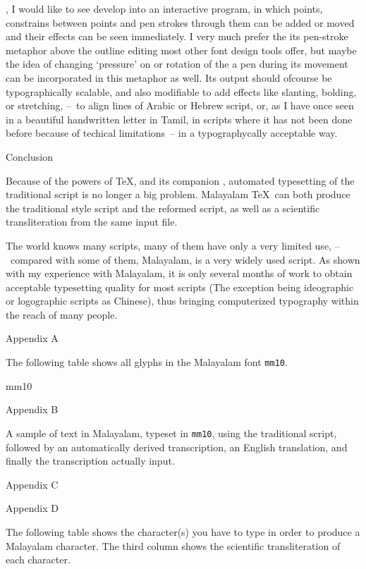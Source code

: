 \MF, I would like to see develop into an interactive program, in which 
points, constrains between points and pen strokes through them can be 
added or moved and their effects can be seen immediately. I very much 
prefer the its pen-stroke metaphor above the outline editing most 
other font design tools offer, but maybe the idea of changing 
`pressure' on or rotation of the a pen during its movement can be 
incorporated in this metaphor as well. Its output should ofcourse be
typographically scalable, and also modifiable to add effects like 
slanting, bolding, or stretching, --~to align lines of
Arabic or Hebrew script, or, as I have once seen in a beautiful
handwritten letter in Tamil, in scripts where it has not been done
before because of techical limitations~-- in a typographycally
acceptable way.

\beginsection Conclusion

Because of the powers of \TeX, and its companion \MF, automated 
typesetting of the traditional script is no longer a big problem. 
Malayalam \TeX\ can both produce the traditional style script and the 
reformed script, as well as a scientific transliteration from the same 
input file.

The world knows many scripts, many of them have only a very limited 
use, --~compared with some of them, Malayalam, is a very widely used 
script. As shown with my experience with Malayalam, it is only several 
months of work to obtain acceptable typesetting quality for most 
scripts (The exception being ideographic or logographic scripts as 
Chinese), thus bringing computerized typography within the reach of 
many people.

\beginsection Appendix A

The following table shows all glyphs in the Malayalam font {\tt mm10}.
\bigskip

\table mm10

\beginsection Appendix B

A sample of text in Malayalam, typeset in {\tt mm10}, using the 
traditional script, followed by an automatically derived transcription, 
an English translation, and finally the transcription actually input.
\bigskip


\beginsection Appendix C



\beginsection Appendix D

The following table shows the character(s) you have to type in order 
to produce a Malayalam character. The third column shows the 
scientific transliteration of each character.
\bigskip


\bye
